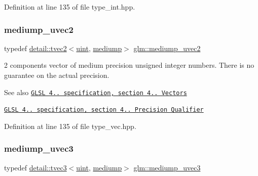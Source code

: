 Definition at line 135 of file type\+\_\+int.\+hpp.

\mbox{\label{group__core__precision_ga15c8fb77bdb6763ef73b39e02eb98a56}} 
\subsubsection{\texorpdfstring{mediump\+\_\+uvec2}{mediump\_uvec2}}
{\footnotesize\ttfamily typedef \hyperlink{structglm_1_1detail_1_1tvec2}{detail\+::tvec2}$<$\hyperlink{group__core__precision_ga4fd29415871152bfb5abd588334147c8}{uint}, \hyperlink{namespaceglm_a0f04f086094c747d227af4425893f545a6416f3ea0c9025fb21ed50c4d6620482}{mediump}$>$ \hyperlink{group__core__precision_ga15c8fb77bdb6763ef73b39e02eb98a56}{glm\+::mediump\+\_\+uvec2}}

2 components vector of medium precision unsigned integer numbers. There is no guarantee on the actual precision.

\begin{DoxySeeAlso}{See also}
\href{http://www.opengl.org/registry/doc/GLSLangSpec.4.20.8.pdf}{\tt G\+L\+SL 4.. specification, section 4.. Vectors} 

\href{http://www.opengl.org/registry/doc/GLSLangSpec.4.20.8.pdf}{\tt G\+L\+SL 4.. specification, section 4.. Precision Qualifier} 
\end{DoxySeeAlso}


Definition at line 135 of file type\+\_\+vec.\+hpp.

\mbox{\label{group__core__precision_gaebdefe98b08421ef645f65c706af46b2}} 
\subsubsection{\texorpdfstring{mediump\+\_\+uvec3}{mediump\_uvec3}}
{\footnotesize\ttfamily typedef \hyperlink{structglm_1_1detail_1_1tvec3}{detail\+::tvec3}$<$\hyperlink{group__core__precision_ga4fd29415871152bfb5abd588334147c8}{uint}, \hyperlink{namespaceglm_a0f04f086094c747d227af4425893f545a6416f3ea0c9025fb21ed50c4d6620482}{mediump}$>$ \hyperlink{group__core__precision_gaebdefe98b08421ef645f65c706af46b2}{glm\+::mediump\+\_\+uvec3}}

